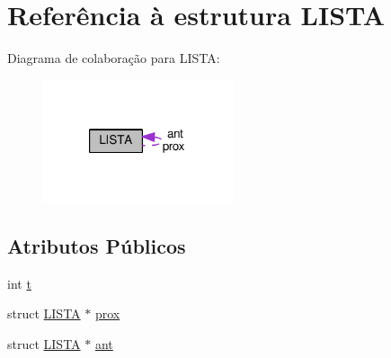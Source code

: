 \hypertarget{structLISTA}{\section{Referência à estrutura L\-I\-S\-T\-A}
\label{structLISTA}
}


Diagrama de colaboração para L\-I\-S\-T\-A\-:
\nopagebreak
\begin{figure}[H]
\begin{center}
\leavevmode
\includegraphics[width=160pt]{structLISTA__coll__graph}
\end{center}
\end{figure}
\subsection*{Atributos Públicos}
\begin{DoxyCompactItemize}
\item 
int \hyperlink{structLISTA_a81b29c44560db14d9d5ef75858c91a0b}{t}
\item 
struct \hyperlink{structLISTA}{L\-I\-S\-T\-A} $\ast$ \hyperlink{structLISTA_a818a9fbd5f34b29597c140c052309ea6}{prox}
\item 
struct \hyperlink{structLISTA}{L\-I\-S\-T\-A} $\ast$ \hyperlink{structLISTA_acbab5a56fa16181657e3036ffa9fca11}{ant}
\end{DoxyCompactItemize}


